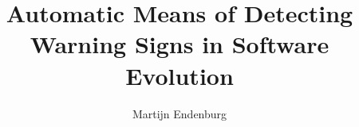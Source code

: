 \documentclass{uvamscse}
\title{Automatic Means of Detecting Warning Signs in Software Evolution}
\author{Martijn Endenburg}
\begin{document}
\maketitle












{}


%
\end{document}
